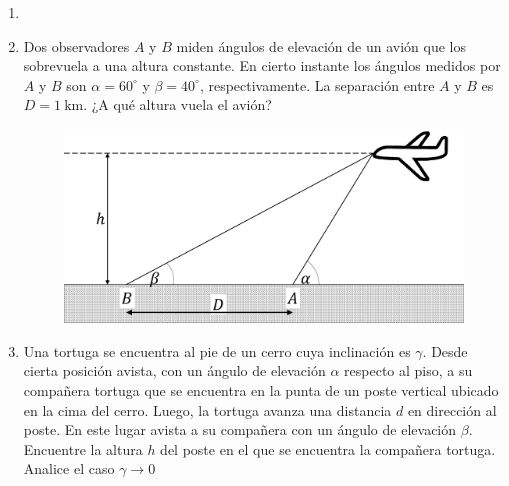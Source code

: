 \documentclass[letterpaper,11pt]{article}
\begin{document}
\vspace{-1cm}
\begin{enumerate}\setlength{\itemsep}{0.4cm}


\item[]

\item Dos observadores $A$ y $B$ miden ángulos de elevación de un avión que los sobrevuela a una altura constante. En cierto instante los ángulos medidos por $A$ y $B$ son $\alpha = 60^{\circ}$ y $\beta = 40^{\circ}$, respectivamente. La separación entre $A$ y  $B$ es $D = \SI{1}{\km}$. ¿A qué altura vuela el avión?

\begin{figure}[H]
    \centering
    \includegraphics[width=0.35\linewidth]{2021-1/Imagenes/aux0/avion.pdf}
\end{figure}


\item Una tortuga se encuentra al pie de un cerro cuya inclinación es $\gamma$. Desde cierta posición avista, con un ángulo de elevación $\alpha$ respecto al piso, a su compañera tortuga que se encuentra en la punta de un poste vertical ubicado en la cima del cerro. Luego, la tortuga avanza una distancia $d$ en dirección al poste. En este lugar avista a su compañera con un ángulo de elevación $\beta$. Encuentre la altura $h$ del poste en el que se encuentra la compañera tortuga. Analice el caso $\gamma\rightarrow 0$

\begin{figure}[H]
    \centering
        \centering
        
\end{figure}




%   

\end{enumerate}
\end{document}
